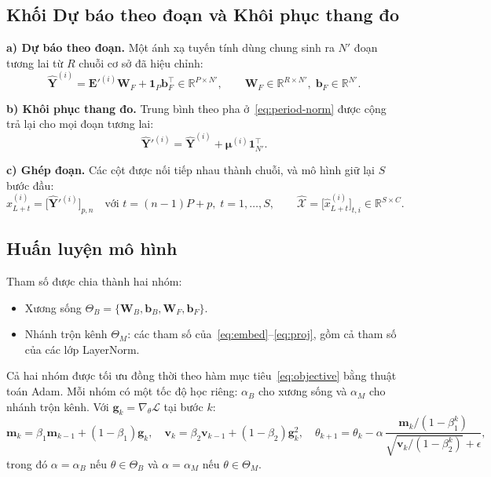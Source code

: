 \documentclass[12pt,a4paper]{report}
\numberwithin{equation}{chapter}
\newcommand{\R}{\mathbb{R}}
\newcommand{\one}{\mathbf{1}}
\begin{document}
\subsection{Khối Dự báo theo đoạn và Khôi phục thang đo}
\label{sec:forecast}

\textbf{a) Dự báo theo đoạn.} Một ánh xạ tuyến tính dùng chung sinh ra $N'$ đoạn tương lai từ $R$ chuỗi cơ sở đã
hiệu chỉnh:
\begin{equation}
\hat{\mathbf{Y}}^{(i)} = \mathbf{E}'^{(i)}\mathbf{W}_F + \one_P\mathbf{b}_F^{\top}\in\R^{P\times N'},
\qquad \mathbf{W}_F\in\R^{R\times N'},\;\mathbf{b}_F\in\R^{N'}.
\label{eq:forecast}
\end{equation}

\textbf{b) Khôi phục thang đo.} Trung bình theo pha ở~\eqref{eq:period-norm} được cộng trả lại cho mọi đoạn tương
lai:
\begin{equation}
\hat{\mathbf{Y}}'^{(i)} = \hat{\mathbf{Y}}^{(i)} + \bm{\mu}^{(i)}\one_{N'}^{\top}.
\label{eq:denorm}
\end{equation}

\textbf{c) Ghép đoạn.} Các cột được nối tiếp nhau thành chuỗi, và mô hình giữ lại $S$ bước đầu:
\begin{equation}
\hat{x}^{(i)}_{L+t} = \big[\hat{\mathbf{Y}}'^{(i)}\big]_{p,n}\quad\text{với } t=(n-1)P+p,\; t=1,\dots,S,
\qquad
\hat{\mathcal{X}} = \big[\hat{x}^{(i)}_{L+t}\big]_{t,i}\in\R^{S\times C}.
\label{eq:merge}
\end{equation}

\subsection{Huấn luyện mô hình}
\label{sec:training}

Tham số được chia thành hai nhóm:
\begin{itemize}
  \item Xương sống $\Theta_B=\{\mathbf{W}_B,\mathbf{b}_B,\mathbf{W}_F,\mathbf{b}_F\}$.
  \item Nhánh trộn kênh $\Theta_M$: các tham số của~\eqref{eq:embed}--\eqref{eq:proj}, gồm cả tham số của các lớp
        LayerNorm.
\end{itemize}
Cả hai nhóm được tối ưu đồng thời theo hàm mục tiêu~\eqref{eq:objective} bằng thuật toán Adam. Mỗi nhóm có một tốc
độ học riêng: $\alpha_B$ cho xương sống và $\alpha_M$ cho nhánh trộn kênh. Với $\mathbf{g}_k=\nabla_{\theta}\mathcal{L}$
tại bước $k$:
\begin{equation}
\mathbf{m}_k=\beta_1\mathbf{m}_{k-1}+(1-\beta_1)\mathbf{g}_k,\quad
\mathbf{v}_k=\beta_2\mathbf{v}_{k-1}+(1-\beta_2)\mathbf{g}_k^{2},\quad
\theta_{k+1}=\theta_k-\alpha\,\frac{\mathbf{m}_k/(1-\beta_1^{k})}{\sqrt{\mathbf{v}_k/(1-\beta_2^{k})}+\epsilon},
\label{eq:adam}
\end{equation}
trong đó $\alpha=\alpha_B$ nếu $\theta\in\Theta_B$ và $\alpha=\alpha_M$ nếu $\theta\in\Theta_M$.
\end{document}
